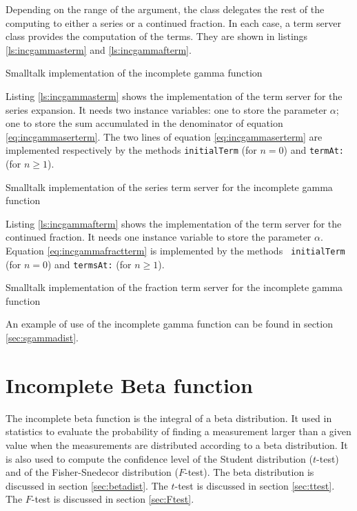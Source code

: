 \documentclass[twoside]{book}
\begin{document}
Depending on the range of the argument, the class delegates the
rest of the computing to either a series or a continued fraction.
In each case, a term server class provides the computation of the
terms. They are shown in listings \ref{ls:incgammasterm} and
\ref{ls:incgammafterm}.
\begin{listing} Smalltalk implementation of the incomplete gamma function \label{ls:incgamma}

\end{listing}
Listing \ref{ls:incgammasterm} shows the implementation of the
term server for the series expansion. It needs two instance
variables: one to store the parameter $\alpha$; one to store the
sum accumulated in the denominator of equation
\ref{eq:incgammaserterm}. The two lines of equation
\ref{eq:incgammaserterm} are implemented respectively by the
methods {\tt initialTerm}  (for $n=0$) and {\tt termAt:} (for
$n\ge 1$).
\begin{listing} Smalltalk implementation of the series term server for the incomplete gamma function \label{ls:incgammasterm}

\end{listing}
Listing \ref{ls:incgammafterm} shows the implementation of the
term server for the continued fraction. It needs one instance
variable to store the parameter $\alpha$. Equation
\ref{eq:incgammafractterm} is implemented by the methods {\tt
initialTerm}  (for $n=0$) and {\tt termsAt:} (for $n\ge 1$).
\begin{listing} Smalltalk implementation of the fraction term server for the incomplete gamma function \label{ls:incgammafterm}

\end{listing}
An example of use of the incomplete gamma function can be found in
section \ref{sec:sgammadist}.


\section{Incomplete Beta function}
\label{sec:incbeta} The incomplete beta function is the integral
of a beta distribution. It used in statistics to evaluate the
probability of finding a measurement larger than a given value
when the measurements are distributed according to a beta
distribution. It is also used to compute the confidence level of
the Student distribution ($t$-test) and of the Fisher-Snedecor
distribution ($F$-test). The beta distribution is discussed in
section \ref{sec:betadist}. The $t$-test is discussed in section
\ref{sec:ttest}. The $F$-test is discussed in section
\ref{sec:Ftest}.
\end{document}
